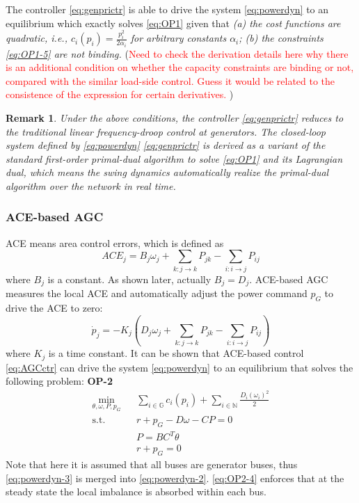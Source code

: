 \documentclass[journal,12pt,onecolumn,draftclsnofoot]{IEEEtran}
\newtheorem{remark}{Remark}
\begin{document}
The controller \eqref{eq:genprictr} is able to drive the system \eqref{eq:powerdyn} to an equilibrium which exactly solves \eqref{eq:OP1} given that \emph{(a) the cost functions are quadratic, i.e., $c_i(p_i)=\frac{p_i^2}{2\alpha_i}$ for arbitrary constants $\alpha_i$; (b) the constraints \eqref{eq:OP1-5} are not binding.} (\textcolor{red}{Need to check the derivation details here why there is an additional condition on whether the capacity constraints are binding or not, compared with the similar load-side control. Guess it would be related to the consistence of the expression for certain derivatives. })

\begin{remark}
Under the above conditions, the controller \eqref{eq:genprictr} reduces to the traditional linear frequency-droop control at generators. The closed-loop system defined by \eqref{eq:powerdyn} \eqref{eq:genprictr} is derived as a variant of the standard first-order primal-dual algorithm to solve \eqref{eq:OP1} and its Lagrangian dual, which means the swing dynamics automatically realize the primal-dual algorithm over the network in real time.
\end{remark}



\subsubsection{ACE-based AGC \cite{li2016connecting}}
ACE means area control errors, which is defined as
\begin{equation}
ACE_j=B_j\omega_j+\sum_{k:j\rightarrow k} P_{jk} -\sum_{i:i\rightarrow j} P_{ij}
\end{equation}
where $B_j$ is a constant. As shown later, actually $B_j=D_j$.
ACE-based AGC measures the local ACE and automatically adjust the power command $p_G$ to drive the ACE to zero:
\begin{equation}\label{eq:AGCctr}
\dot p_j=-K_j\left(D_j\omega_j+\sum_{k:j\rightarrow k} P_{jk} -\sum_{i:i\rightarrow j} P_{ij}\right)
\end{equation}
where $K_j$ is a time constant.
It can be shown that ACE-based control \eqref{eq:AGCctr} can drive the system \eqref{eq:powerdyn} to an equilibrium that solves the following problem:
\noindent
\textbf{OP-2}
\begin{subequations}
	\begin{eqnarray}
	\min_{\theta, \omega, P, p_G} && \sum_{i\in\mathbb{G}} c_i(p_i) +\sum_{i\in\mathbb{N}} \frac{D_i (\omega_i)^2}{2} \\
	\mathrm{s.t.} && r+p_G-D\omega-CP=0 \\
	&& P=BC^T\theta\\
	\label{eq:OP2-4}
	&& r+p_G=0
	\end{eqnarray}\label{eq:OP2}%
\end{subequations}
Note that here it is assumed that all buses are generator buses, thus \eqref{eq:powerdyn-3} is merged into \eqref{eq:powerdyn-2}. \eqref{eq:OP2-4} enforces that at the steady state the local imbalance is absorbed within each bus.
\end{document}
